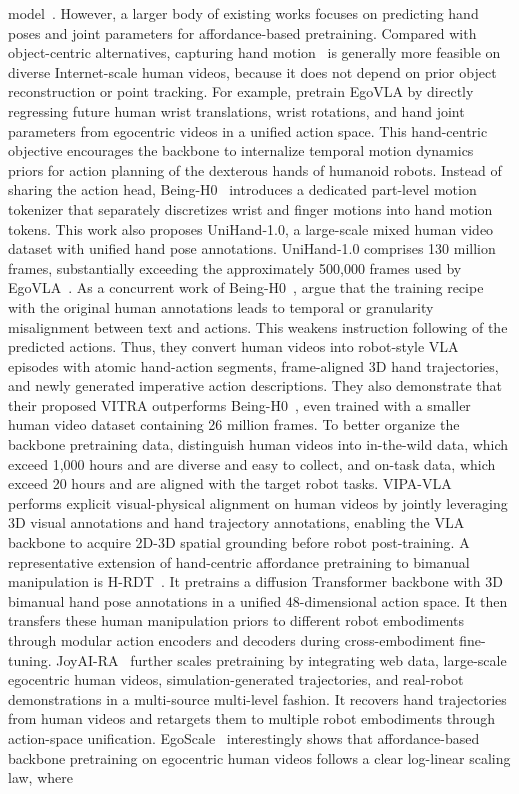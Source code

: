 \documentclass[Afour,sageh,times]{sagej}
\begin{document}
model~\citep{black2024pi_0}. However, a larger body of existing works focuses on predicting hand poses and joint parameters for affordance-based pretraining. Compared with object-centric alternatives, capturing hand motion~\citep{pavlakos2024reconstructing,potamias2025wilor,zhang2025hawor} is generally more feasible on diverse Internet-scale human videos, because it does not depend on prior object reconstruction or point tracking. For example, \cite{yang2025egovla} pretrain EgoVLA by directly regressing future human wrist translations, wrist rotations, and hand joint parameters from egocentric videos in a unified action space. This hand-centric objective encourages the backbone to internalize temporal motion dynamics priors for action planning of the dexterous hands of humanoid robots. Instead of sharing the action head, Being-H0~\citep{luo2025being} introduces a dedicated part-level motion tokenizer that separately discretizes wrist and finger motions into hand motion tokens. This work also proposes UniHand-1.0, a large-scale mixed human video dataset with unified hand pose annotations. UniHand-1.0 comprises 130 million frames, substantially exceeding the approximately 500,000 frames used by EgoVLA~\citep{yang2025egovla}. As a concurrent work of Being-H0~\citep{luo2025being}, \cite{li2025scalable} argue that the training recipe with the original human annotations leads to temporal or granularity misalignment between text and actions. This weakens instruction following of the predicted actions. Thus, they convert human videos into robot-style VLA episodes with atomic hand-action segments, frame-aligned 3D hand trajectories, and newly generated imperative action descriptions. They also demonstrate that their proposed VITRA outperforms Being-H0~\citep{luo2025being}, even trained with a smaller human video dataset containing 26 million frames. To better organize the backbone pretraining data, \cite{cai2025n} distinguish human videos into in-the-wild data, which exceed 1,000 hours and are diverse and easy to collect, and on-task data, which exceed 20 hours and are aligned with the target robot tasks. VIPA-VLA~\citep{feng2025spatial} performs explicit visual-physical alignment on human videos by jointly leveraging 3D visual annotations and hand trajectory annotations, enabling the VLA backbone to acquire 2D-3D spatial grounding before robot post-training. A representative extension of hand-centric affordance pretraining to bimanual manipulation is H-RDT~\citep{bi2026h}. It pretrains a diffusion Transformer backbone with 3D bimanual hand pose annotations in a unified 48-dimensional action space. It then transfers these human manipulation priors to different robot embodiments through modular action encoders and decoders during cross-embodiment fine-tuning. JoyAI-RA~\citep{zhang2026joyai} further scales pretraining by integrating web data, large-scale egocentric human videos, simulation-generated trajectories, and real-robot demonstrations in a multi-source multi-level fashion. It recovers hand trajectories from human videos and retargets them to multiple robot embodiments through action-space unification. EgoScale~\citep{zheng2026egoscale} interestingly shows that affordance-based backbone pretraining on egocentric human videos follows a clear log-linear scaling law, where 
\end{document}
